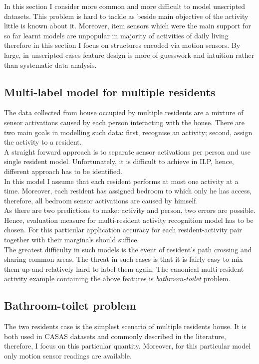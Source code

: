 \documentclass[11pt, a4paper, pdflatex, leqno, twoside, openright]{report}
\begin{document}
In this section I consider more common and more difficult to model unscripted datasets. This problem is hard to tackle as beside main objective of the activity little is known about it. Moreover, item sensors which were the main support for so far learnt models are unpopular in majority of activities of daily living therefore in this section I focus on structures encoded via motion sensors. By large, in unscripted cases feature design is more of guesswork and intuition rather than systematic data analysis.

    \subsection{Multi-label model for multiple residents\label{ch:mlm}}
The data collected from house occupied by multiple residents are a mixture of sensor activations caused by each person interacting with the house. There are two main goals in modelling such data: first, recognise an activity; second, assign the activity to a resident.\\
A straight forward approach is to separate sensor activations per person and use single resident model. Unfortunately, it is difficult to achieve in ILP, hence, different approach has to be identified.\\

In this model I assume that each resident performs at most one activity at a time. Moreover, each resident has assigned bedroom to which only he has access, therefore, all bedroom sensor activations are caused by himself.\\
As there are two predictions to make: activity and person, two errors are possible. Hence, evaluation measure for multi-resident activity recognition model has to be chosen. For this particular application accuracy for each resident-activity pair together with their marginals should suffice.\\

The greatest difficulty in such models is the event of resident's path crossing and sharing common areas. The threat in such cases is that it is fairly easy to mix them up and relatively hard to label them again. The canonical multi-resident activity example containing the above features is \emph{bathroom-toilet} problem.

    \subsection{Bathroom-toilet problem}
The two residents case is the simplest scenario of multiple residents house. It is both used in CASAS datasets and commonly described in the literature, therefore, I focus on this particular quantity. Moreover, for this particular model only motion sensor readings are available.\\
\end{document}
